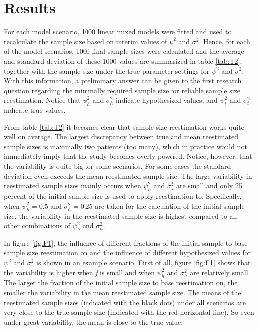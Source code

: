 \documentclass[11pt]{article}
\begin{document}
\section{Results} \label{Results}
For each model scenario, 1000 linear mixed models were fitted and used to recalculate the sample size based on interim values of $\psi^2$ and $\sigma^2$. Hence, for each of the model scenarios, 1000 final sample sizes were calculated and the average and standard deviation of these 1000 values are summarized in table \ref{tab:T2}, together with the sample size under the true parameter settings for $\psi^2$ and $\sigma^2$. With this information, a preliminary answer can be given to the first research question regarding the minimally required sample size for reliable sample size reestimation. Notice that $\psi_h^2$ and $\sigma_h^2$ indicate hypothesized values, and $\psi_t^2$ and $\sigma_t^2$ indicate true values.

From table \ref{tab:T2} it becomes clear that sample size reestimation works quite well on average. The largest discrepancy between true and mean reestimated sample sizes is maximally two patients (too many), which in practice would not immediately imply that the study becomes overly powered. Notice, however, that the variability is quite big for some scenarios. For some cases the standard deviation even exceeds the mean reestimated sample size. The large variability in reestimated sample sizes mainly occurs when $\psi_h^2$ and $\sigma_h^2$ are small and only 25 percent of the initial sample size is used to apply reestimation to. Specifically, when $\psi_h^2 =0.5$ and $\sigma_h^2 = 0.25$ are taken for the calculation of the initial sample size, the variability in the reestimated sample size is highest compared to all other combinations of $\psi_h^2$ and $\sigma_h^2$. 

In figure \ref{fig:F1}, the influence of different fractions of the initial sample to base sample size reestimation on and the influence of different hypothesized values for $\psi^2$ and $\sigma^2$ is shown in an example scenario. First of all, figure \ref{fig:F1} shows that the variability is higher when \textit{f} is small and when $\psi_h^2$ and $\sigma_h^2$ are relatively small. The larger the fraction of the initial sample size to base reestimation on, the smaller the variability in the mean reestimated sample size. The means of the reestimated sample sizes (indicated with the black dots) under all scenarios are very close to the true sample size (indicated with the red horizontal line). So even under great variability, the mean is close to the true value.
\end{document}
